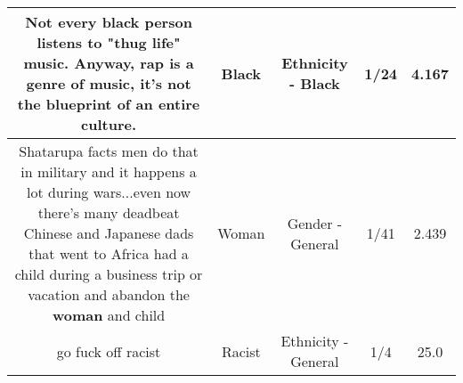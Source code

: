 \documentclass[11pt]{article}
\newlength\mylength
\begin{document}
\begin{center}
\begin{longtable}{|C{.65\mylength}|C{.30\mylength}|C{.12\mylength}|C{.12\mylength}|C{.12\mylength}|}
  \small Not every \textbf{black} person listens to "thug life" music. Anyway, rap is a genre of music, it's not the blueprint of an entire culture.\normalsize   & Black & Ethnicity - Black & 1/24 & 4.167 \\  \hline
  \small Shatarupa facts men do that in military and it happens a lot during wars...even now there's many deadbeat Chinese and Japanese dads that went to Africa had a child during a business trip or vacation and abandon the \textbf{woman} and child\normalsize   & Woman & Gender - General & 1/41 & 2.439 \\  \hline
  \small go fuck off racist\normalsize   & Racist & Ethnicity - General & 1/4 & 25.0 \\  \hline
  
\end{longtable}
\end{center}
\end{document}
